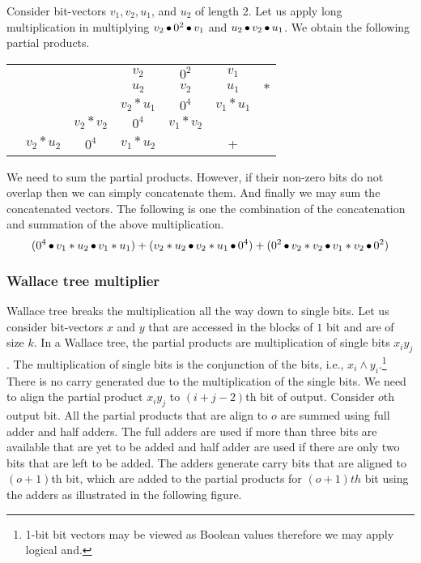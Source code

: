 \begin{example}
  Consider bit-vectors $v_1,v_2,u_1$, and $u_2$ of length 2.
  Let us apply long multiplication in multiplying
  $v_2 \mathop{\bullet} 0^2 \mathop{\bullet} v_1$ and $u_2 \mathop{\bullet} v_2 \mathop{\bullet} u_1$.
  We obtain the following partial products.
\begin{center}
\begin{tabular}{c@{\quad}c@{\quad}c@{\quad}c@{\quad}c@{\quad}c@{\quad}c}
  &&& $v_2$ & $0^2$ & $v_1$&\\ 
  &&& $u_2$ & $v_2$ & $u_1$&$*$\\ \hline
  &&&$v_2*u_1$& $0^4$ & $v_1*u_1$&\\
  &&$v_2*v_2$&$0^4$& $v_1*v_2$ && \\
  &$v_2*u_2$& $0^4$ &$v_1*u_2$&  & +&\\\hline
\end{tabular}
\end{center}
We need to sum the partial products. However, if their non-zero bits 
do not overlap then we can simply concatenate them.
%
And finally we may sum the concatenated vectors.
%
The following is one the combination of the concatenation and 
summation of the above multiplication.
$$
( 0^4 \mathop{\bullet} v_1*u_2 \mathop{\bullet} v_1*u_1) +
(v_2*u_2 \mathop{\bullet} v_2*u_1 \mathop{\bullet} 0^4) +
(0^2 \mathop{\bullet} v_2*v_2 \mathop{\bullet} v_1*v_2 \mathop{\bullet} 0^2)
$$
\end{example}


\subsubsection{Wallace tree multiplier}
%
Wallace tree breaks the multiplication all the way down to single bits.
%
Let us consider bit-vectors $x$ and $y$ that are accessed in the blocks of $1$
bit and are of size $k$.
%
In a Wallace tree, the partial products are multiplication of single
bits $x_iy_j$.
%
The multiplication of single bits is the conjunction of the bits, i.e.,
$x_i \land y_i$.\footnote{1-bit bit vectors may be viewed as Boolean values therefore we may apply logical and.}
%
There is no carry generated due to the multiplication of the single bits.
%
We need to align the partial product $x_iy_j$ to $(i+j-2)$th bit of output.
%
Consider $o$th output bit.
%
All the partial products that are align to $o$ are summed using full adder 
and half adders.
%
The full adders are used
if more than three bits are available that are yet to be added
and half adder are used if there are only two bits that are left to be added.
%
The adders generate carry bits that are aligned to $(o+1)$th bit,
which are added to the partial products for $(o+1)th$ bit using the 
adders as illustrated in the following figure.

